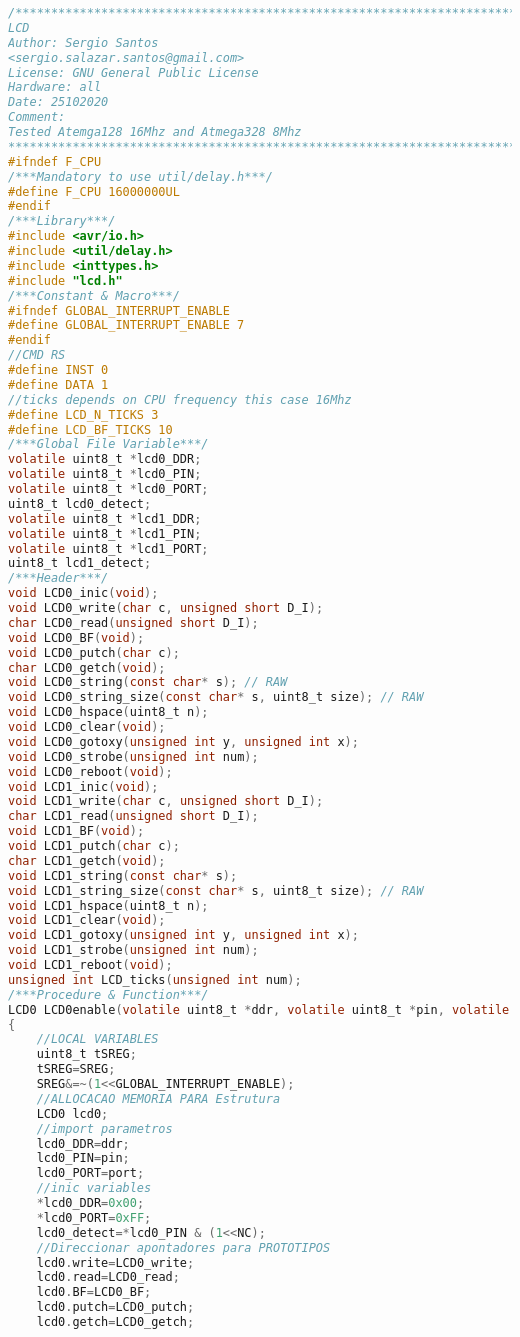 \begin{lstlisting}[language=C]
/*************************************************************************
LCD
Author: Sergio Santos 
<sergio.salazar.santos@gmail.com>
License: GNU General Public License
Hardware: all
Date: 25102020
Comment:
Tested Atemga128 16Mhz and Atmega328 8Mhz                    
************************************************************************/
#ifndef F_CPU
/***Mandatory to use util/delay.h***/
#define F_CPU 16000000UL
#endif
/***Library***/
#include <avr/io.h>
#include <util/delay.h>
#include <inttypes.h>
#include "lcd.h"
/***Constant & Macro***/
#ifndef GLOBAL_INTERRUPT_ENABLE
#define GLOBAL_INTERRUPT_ENABLE 7
#endif
//CMD RS
#define INST 0
#define DATA 1
//ticks depends on CPU frequency this case 16Mhz
#define LCD_N_TICKS 3
#define LCD_BF_TICKS 10
/***Global File Variable***/
volatile uint8_t *lcd0_DDR;
volatile uint8_t *lcd0_PIN;
volatile uint8_t *lcd0_PORT;
uint8_t lcd0_detect;
volatile uint8_t *lcd1_DDR;
volatile uint8_t *lcd1_PIN;
volatile uint8_t *lcd1_PORT;
uint8_t lcd1_detect;
/***Header***/
void LCD0_inic(void);
void LCD0_write(char c, unsigned short D_I);
char LCD0_read(unsigned short D_I);
void LCD0_BF(void);
void LCD0_putch(char c);
char LCD0_getch(void);
void LCD0_string(const char* s); // RAW
void LCD0_string_size(const char* s, uint8_t size); // RAW
void LCD0_hspace(uint8_t n);
void LCD0_clear(void);
void LCD0_gotoxy(unsigned int y, unsigned int x);
void LCD0_strobe(unsigned int num);
void LCD0_reboot(void);
void LCD1_inic(void);
void LCD1_write(char c, unsigned short D_I);
char LCD1_read(unsigned short D_I);
void LCD1_BF(void);
void LCD1_putch(char c);
char LCD1_getch(void);
void LCD1_string(const char* s);
void LCD1_string_size(const char* s, uint8_t size); // RAW
void LCD1_hspace(uint8_t n);
void LCD1_clear(void);
void LCD1_gotoxy(unsigned int y, unsigned int x);
void LCD1_strobe(unsigned int num);
void LCD1_reboot(void);
unsigned int LCD_ticks(unsigned int num);
/***Procedure & Function***/
LCD0 LCD0enable(volatile uint8_t *ddr, volatile uint8_t *pin, volatile uint8_t *port)
{
	//LOCAL VARIABLES
	uint8_t tSREG;
	tSREG=SREG;
	SREG&=~(1<<GLOBAL_INTERRUPT_ENABLE);
	//ALLOCACAO MEMORIA PARA Estrutura
	LCD0 lcd0;
	//import parametros
	lcd0_DDR=ddr;
	lcd0_PIN=pin;
	lcd0_PORT=port;
	//inic variables
	*lcd0_DDR=0x00;
	*lcd0_PORT=0xFF;
	lcd0_detect=*lcd0_PIN & (1<<NC);
	//Direccionar apontadores para PROTOTIPOS
	lcd0.write=LCD0_write;
	lcd0.read=LCD0_read;
	lcd0.BF=LCD0_BF;
	lcd0.putch=LCD0_putch;
	lcd0.getch=LCD0_getch;

\end{lstlisting}
